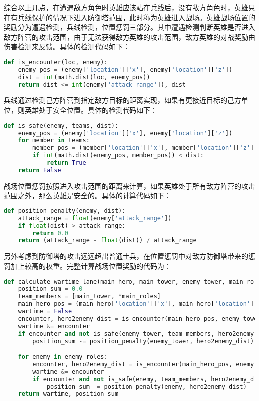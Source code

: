 综合以上几点，在遭遇敌方角色时英雄应该站在兵线后，没有敌方角色时，英雄只在有兵线保护的情况下进入防御塔范围，此时称为英雄进入战场。英雄战场位置的奖励分为遭遇检测，兵线检测，位置惩罚三部分。其中遭遇检测判断英雄是否进入敌方阵营的攻击范围，由于无法获得敌方英雄的攻击范围，敌方英雄的对战奖励由伤害检测来反馈。具体的检测代码如下：

\begin{lstlisting}[language=Python]
def is_encounter(loc, enemy):
    enemy_pos = (enemy['location']['x'], enemy['location']['z'])
    dist = int(math.dist(loc, enemy_pos))
    return dist <= int(enemy['attack_range']), dist
\end{lstlisting}

兵线通过检测己方阵营到指定敌方目标的距离实现，如果有更接近目标的己方单位，则英雄处于安全位置。具体的检测代码如下：

\begin{lstlisting}[language=Python]
def is_safe(enemy, teams, dist):
    enemy_pos = (enemy['location']['x'], enemy['location']['z'])
    for member in teams:
        member_pos = (member['location']['x'], member['location']['z'])
        if int(math.dist(enemy_pos, member_pos)) < dist:
            return True
    return False
\end{lstlisting}

战场位置惩罚按照进入攻击范围的距离来计算，如果英雄处于所有敌方阵营的攻击范围之外，那么英雄是安全的。具体的计算代码如下：

\begin{lstlisting}[language=Python]
def position_penalty(enemy, dist):
    attack_range = float(enemy['attack_range'])
    if float(dist) > attack_range:
        return 0.0
    return (attack_range - float(dist)) / attack_range
\end{lstlisting}

另外考虑到防御塔的攻击远远超出普通士兵，在位置惩罚中对敌方防御塔带来的惩罚加上较高的权重。完整计算战场位置奖励的代码为：

\begin{lstlisting}[language=Python]
def calculate_wartime_lane(main_hero, main_tower, enemy_tower, main_roles, enemy_roles):
    position_sum = 0.0
    team_members = [main_tower, *main_roles]
    main_hero_pos = (main_hero['location']['x'], main_hero['location']['z'])
    wartime = False
    encounter, hero2enemy_dist = is_encounter(main_hero_pos, enemy_tower)
    wartime &= encounter
    if encounter and not is_safe(enemy_tower, team_members, hero2enemy_dist):
        position_sum -= position_penalty(enemy_tower, hero2enemy_dist) * 10

    for enemy in enemy_roles:
        encounter, hero2enemy_dist = is_encounter(main_hero_pos, enemy)
        wartime &= encounter
        if encounter and not is_safe(enemy, team_members, hero2enemy_dist):
            position_sum -= position_penalty(enemy, hero2enemy_dist)
    return wartime, position_sum
\end{lstlisting}

